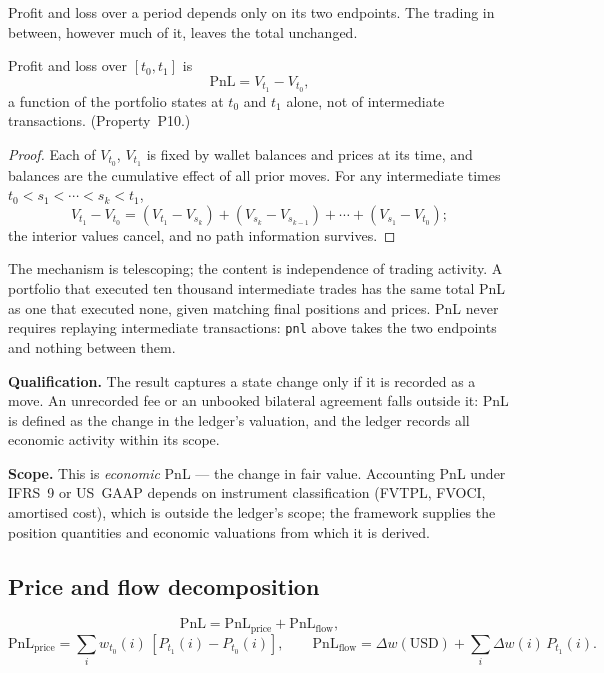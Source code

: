 \noindent Profit and loss over a period depends only on its two endpoints. The trading in between, however much of it, leaves the total unchanged.

\begin{theorem}
\label{inv:P10}
Profit and loss over $[t_0, t_1]$ is
\[
\mathrm{PnL} = V_{t_1} - V_{t_0},
\]
a function of the portfolio states at $t_0$ and $t_1$ alone, not of intermediate transactions. (Property~P10.)
\end{theorem}

\begin{proof}
Each of $V_{t_0}$, $V_{t_1}$ is fixed by wallet balances and prices at its time, and balances are the cumulative effect of all prior moves. For any intermediate times $t_0 < s_1 < \cdots < s_k < t_1$,
\[
V_{t_1} - V_{t_0} = (V_{t_1} - V_{s_k}) + (V_{s_k} - V_{s_{k-1}}) + \cdots + (V_{s_1} - V_{t_0});
\]
the interior values cancel, and no path information survives.
\end{proof}

\noindent The mechanism is telescoping; the content is independence of trading activity. A portfolio that executed ten thousand intermediate trades has the same total PnL as one that executed none, given matching final positions and prices. PnL never requires replaying intermediate transactions: \texttt{pnl} above takes the two endpoints and nothing between them.

\medskip
\noindent\textbf{Qualification.} The result captures a state change only if it is recorded as a move. An unrecorded fee or an unbooked bilateral agreement falls outside it: PnL is defined as the change in the ledger's valuation, and the ledger records all economic activity within its scope.

\medskip
\noindent\textbf{Scope.} This is \emph{economic} PnL --- the change in fair value. Accounting PnL under IFRS~9 or US~GAAP depends on instrument classification (FVTPL, FVOCI, amortised cost), which is outside the ledger's scope; the framework supplies the position quantities and economic valuations from which it is derived.

\subsection{Price and flow decomposition}

\begin{proposition}
\label{prop:pnl-attribution}
\[
\mathrm{PnL} = \mathrm{PnL}_{\text{price}} + \mathrm{PnL}_{\text{flow}},
\]
\[
\mathrm{PnL}_{\text{price}} = \sum_i w_{t_0}(i)\,[P_{t_1}(i) - P_{t_0}(i)],
\qquad
\mathrm{PnL}_{\text{flow}} = \Delta w(\mathrm{USD}) + \sum_i \Delta w(i)\,P_{t_1}(i).
\]
\end{proposition}

